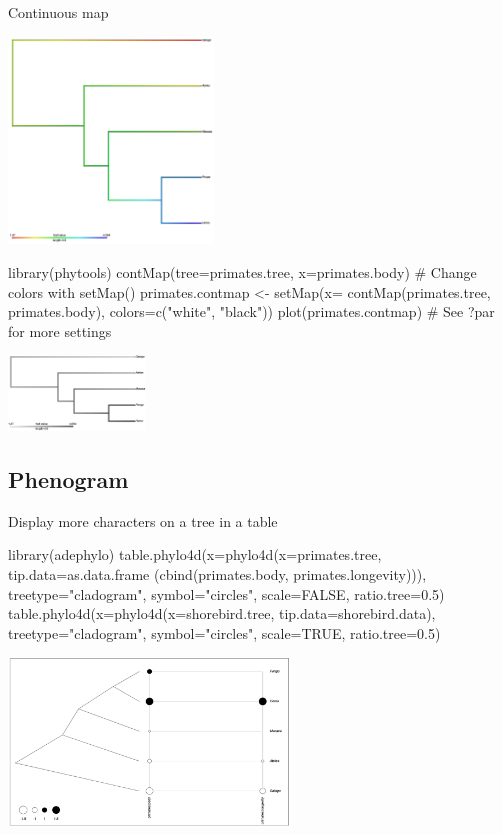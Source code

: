 \documentclass[compress, ucs, xelatex, 11pt, xcolor=svgnames,
  hyperref={
    bookmarks=true,
    unicode=true,
    colorlinks=true,
    pdftitle={Molecular data in R},
    plainpages=false,
    pdfauthor={Vojtech Zeisek},
    pdfsubject={Course about phylogeny and evolution in R},
    pdfcreator={XeLaTeX},
    pdfkeywords={R, evolution, phylogeny, molecular data},
    linkcolor=Tomato,
    anchorcolor=SaddleBrown,
    citecolor=Goldenrod,
    filecolor=DarkMagenta,
    menucolor=Sienna,
    urlcolor=DarkTurquoise,
    pdftex},
  url={hyphens, lowtilde} %
  ]{beamer}
\begin{document}
\begin{frame}[fragile]{Continuous map}
\begin{multicols}{2}
  \vfill
  \begin{center}
    \includegraphics[height=5.5cm]{contmap.png}
  \end{center}
  \vfill
  \begin{spluscode}
    library(phytools)
    contMap(tree=primates.tree,
      x=primates.body)
    # Change colors with setMap()
    primates.contmap <- setMap(x=
      contMap(primates.tree,
      primates.body),
      colors=c("white", "black"))
    plot(primates.contmap)
    # See ?par for more settings
  \end{spluscode}
  \vfill
  \begin{center}
    \includegraphics[height=2cm]{contmapbw.png}
  \end{center}
  \vfill
\end{multicols}
\end{frame}

\subsection{Phenogram}

\begin{frame}[fragile]{Display more characters on a tree in a table}
  \begin{spluscode}
    library(adephylo)
    table.phylo4d(x=phylo4d(x=primates.tree, tip.data=as.data.frame
      (cbind(primates.body, primates.longevity))), treetype="cladogram",
      symbol="circles", scale=FALSE, ratio.tree=0.5)
    table.phylo4d(x=phylo4d(x=shorebird.tree, tip.data=shorebird.data),
      treetype="cladogram", symbol="circles", scale=TRUE, ratio.tree=0.5)
  \end{spluscode}
  \begin{center}
    \includegraphics[height=4.5cm]{phylotable.png}
  \end{center}
\end{frame}
\end{document}
